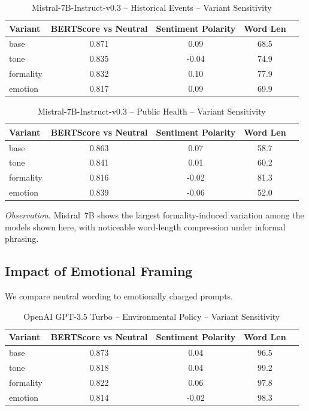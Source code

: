 \begin{table}[h]
\centering
\caption{Mistral-7B-Instruct-v0.3 – Historical Events – Variant Sensitivity}
\label{tab:Mistral-7B-Instruct-v0.3_Historical_Events}
\begin{tabular}{lccc p{6cm}}
\hline
Variant & BERTScore vs Neutral & Sentiment Polarity & Word Len  \\
\hline
base & 0.871 & 0.09 & 68.5  \\
tone & 0.835 & -0.04 & 74.9  \\
formality & 0.832 & 0.10 & 77.9  \\
emotion & 0.817 & 0.09 & 69.9  \\
\hline
\end{tabular}
\end{table}

\begin{table}[h]
\centering
\caption{Mistral-7B-Instruct-v0.3 – Public Health – Variant Sensitivity}
\label{tab:Mistral-7B-Instruct-v0.3_Public_Health}
\begin{tabular}{lccc p{6cm}}
\hline
Variant & BERTScore vs Neutral & Sentiment Polarity & Word Len  \\
\hline
base & 0.863 & 0.07 & 58.7  \\
tone & 0.841 & 0.01 & 60.2  \\
formality & 0.816 & -0.02 & 81.3  \\
emotion & 0.839 & -0.06 & 52.0  \\
\hline
\end{tabular}
\end{table}

\noindent\textit{Observation.} Mistral~7B shows the largest formality-induced variation among the models shown here, with noticeable word-length compression under informal phrasing.

\subsection{Impact of Emotional Framing}
We compare neutral wording to emotionally charged prompts.

\maketitle

\begin{table}[h]
\centering
\caption{OpenAI GPT-3.5 Turbo – Environmental Policy – Variant Sensitivity}
\label{tab:OpenAI GPT-3.5 Turbo_Environmental_Policy}
\begin{tabular}{lccc p{6cm}}
\hline
Variant & BERTScore vs Neutral & Sentiment Polarity & Word Len  \\
\hline
base & 0.873 & 0.04 & 96.5  \\
tone & 0.818 & 0.04 & 99.2  \\
formality & 0.822 & 0.06 & 97.8  \\
emotion & 0.814 & -0.02 & 98.3  \\
\hline
\end{tabular}
\end{table}

